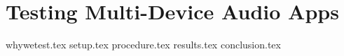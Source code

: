 \chapter{Testing Multi-Device Audio Apps}\label{sec:sota_test}
{whywetest.tex}
{setup.tex}
{procedure.tex}
{results.tex}
{conclusion.tex}
